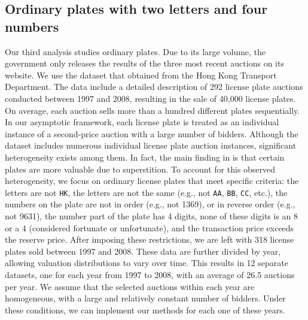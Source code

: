 \subsection{Ordinary plates with two letters and four numbers}

Our third analysis studies ordinary plates. Due to its large volume, the government only releases the results of the three most recent auctions on its website. We use the dataset that \cite{ng/chong/du:2010} obtained from the Hong Kong Transport Department. The data include a detailed description of 292 license plate auctions conducted between 1997 and 2008, resulting in the sale of 40,000 license plates. On average, each auction sells more than a hundred different plates sequentially. In our asymptotic framework, each license plate is treated as an individual instance of a second-price auction with a large number of bidders. Although the dataset includes numerous individual license plate auction instances, significant heterogeneity exists among them. In fact, the main finding in \cite{ng/chong/du:2010} is that certain plates are more valuable due to superstition. To account for this observed heterogeneity, we focus on ordinary license plates that meet specific criteria: the letters are not \texttt{HK}, the letters are not the same (e.g., not \texttt{AA}, \texttt{BB}, \texttt{CC}, etc.), the numbers on the plate are not in order (e.g., not 1369), or in reverse order (e.g., not 9631), the number part of the plate has 4 digits, none of these digits is an 8 or a 4 (considered fortunate or unfortunate), and the transaction price exceeds the reserve price. After imposing these restrictions, we are left with 318 license plates sold between 1997 and 2008. These data are further divided by year, allowing valuation distributions to vary over time. This results in 12 separate datasets, one for each year from 1997 to 2008, with an average of 26.5 auctions per year. We assume that the selected auctions within each year are homogeneous, with a large and relatively constant number of bidders. Under these conditions, we can implement our methods for each one of these years.

